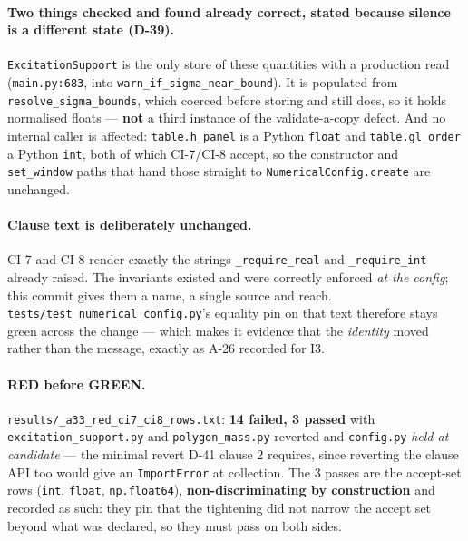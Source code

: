 \documentclass[
  10pt,
]{article}
\begin{document}
\paragraph{Two things checked and found already correct, stated because silence is a different state (D-39).}
\texttt{ExcitationSupport} is the only store of these quantities with a production read (\texttt{main.py:683}, into \texttt{warn\_if\_sigma\_near\_bound}). It is populated from \texttt{resolve\_sigma\_bounds}, which coerced before storing and still does, so it holds normalised floats --- \textbf{not} a third instance of the validate-a-copy defect. And no internal caller is affected: \texttt{table.h\_panel} is a Python \texttt{float} and \texttt{table.gl\_order} a Python \texttt{int}, both of which CI-7/CI-8 accept, so the constructor and \texttt{set\_window} paths that hand those straight to \texttt{NumericalConfig.create} are unchanged.

\paragraph{Clause text is deliberately unchanged.}
CI-7 and CI-8 render exactly the strings \texttt{\_require\_real} and \texttt{\_require\_int} already raised. The invariants existed and were correctly enforced \emph{at the config}; this commit gives them a name, a single source and reach. \texttt{tests/test\_numerical\_config.py}'s equality pin on that text therefore stays green across the change --- which makes it evidence that the \emph{identity} moved rather than the message, exactly as A-26 recorded for I3.

\paragraph{RED before GREEN.}
\texttt{results/\allowbreak{}\_a33\_red\_ci7\_ci8\_rows.txt}: \textbf{14 failed, 3 passed} with \texttt{excitation\_support.py} and \texttt{polygon\_mass.py} reverted and \texttt{config.py} \emph{held at candidate} --- the minimal revert D-41 clause 2 requires, since reverting the clause API too would give an \texttt{ImportError} at collection. The 3 passes are the accept-set rows (\texttt{int}, \texttt{float}, \texttt{np.float64}), \textbf{non-discriminating by construction} and recorded as such: they pin that the tightening did not narrow the accept set beyond what was declared, so they must pass on both sides.
\end{document}
